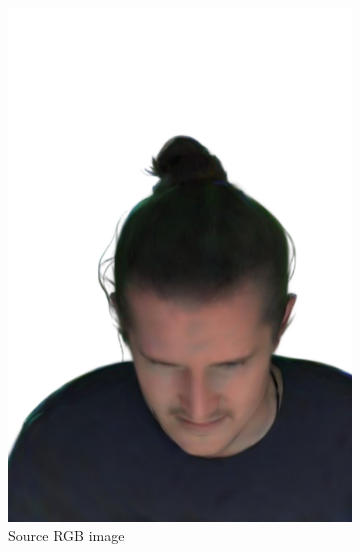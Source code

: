\begin{figure}[H]
	\centering
	\begin{subfigure}{0.3\linewidth}
		\includegraphics[width=\textwidth]{Figures/failed/depth_reprojection/0_render-removebg-preview.png}
		\caption{Source RGB image}
	\end{subfigure}
	\begin{subfigure}{0.3\linewidth}

\end{subfigure}
\end{figure}
